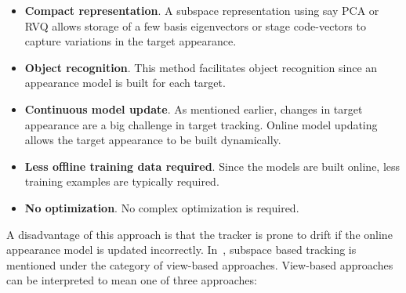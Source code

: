 \begin{itemize}
\item \textbf{Compact representation}.  A subspace representation using say PCA or RVQ allows storage of a few basis eigenvectors or stage code-vectors to capture variations in the target appearance.
\item \textbf{Object recognition}.  This method facilitates object recognition since an appearance model is built for each target.
\item \textbf{Continuous model update}.  As mentioned earlier, changes in target appearance are a big challenge in target tracking.  Online model updating allows the target appearance to be built dynamically.
\item \textbf{Less offline training data required}.  Since the models are built online, less training examples are typically required.
\item \textbf{No optimization}.  No complex optimization is required.
\end{itemize}

A disadvantage of this approach is that the tracker is prone to drift if the online appearance model is updated incorrectly.  In~\cite{2006_JNL_SURVEYtrk_Yilmaz}, subspace based tracking is mentioned under the category of view-based approaches.  View-based approaches can be interpreted to mean one of three approaches:

